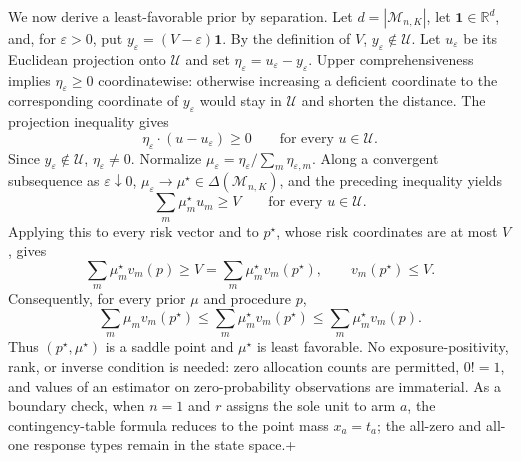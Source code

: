 We now derive a least-favorable prior by separation.  Let \(d=|\mathcal M_{n,K}|\), let \(\mathbf 1\in\mathbb R^d\), and, for \(\varepsilon>0\), put \(y_\varepsilon=(V-\varepsilon)\mathbf 1\).  By the definition of \(V\), \(y_\varepsilon\notin\mathcal U\).  Let \(u_\varepsilon\) be its Euclidean projection onto \(\mathcal U\) and set \(\eta_\varepsilon=u_\varepsilon-y_\varepsilon\).  Upper comprehensiveness implies \(\eta_\varepsilon\ge0\) coordinatewise: otherwise increasing a deficient coordinate to the corresponding coordinate of \(y_\varepsilon\) would stay in \(\mathcal U\) and shorten the distance.  The projection inequality gives
\[
 \eta_\varepsilon\mathbin{\cdot}(u-u_\varepsilon)\ge0
 \qquad\text{for every }u\in\mathcal U.
\]
Since \(y_\varepsilon\notin\mathcal U\), \(\eta_\varepsilon\ne0\).  Normalize
\(\mu_\varepsilon=\eta_\varepsilon/\sum_m\eta_{\varepsilon,m}\).  Along a convergent subsequence as \(\varepsilon\downarrow0\), \(\mu_\varepsilon\to\mu^\star\in\Delta(\mathcal M_{n,K})\), and the preceding inequality yields
\[
 \sum_m\mu_m^\star u_m\ge V
 \qquad\text{for every }u\in\mathcal U.
\]
Applying this to every risk vector and to \(p^\star\), whose risk coordinates are at most \(V\), gives
\[
 \sum_m\mu_m^\star v_m(p)\ge V
 =\sum_m\mu_m^\star v_m(p^\star),
 \qquad v_m(p^\star)\le V.
\]
Consequently, for every prior \(\mu\) and procedure \(p\),
\[
 \sum_m\mu_m v_m(p^\star)
 \le\sum_m\mu_m^\star v_m(p^\star)
 \le\sum_m\mu_m^\star v_m(p).
\]
Thus \((p^\star,\mu^\star)\) is a saddle point and \(\mu^\star\) is least favorable.  No exposure-positivity, rank, or inverse condition is needed: zero allocation counts are permitted, \(0!=1\), and values of an estimator on zero-probability observations are immaterial.  As a boundary check, when \(n=1\) and \(r\) assigns the sole unit to arm \(a\), the contingency-table formula reduces to the point mass \(x_a=t_a\); the all-zero and all-one response types remain in the state space.+